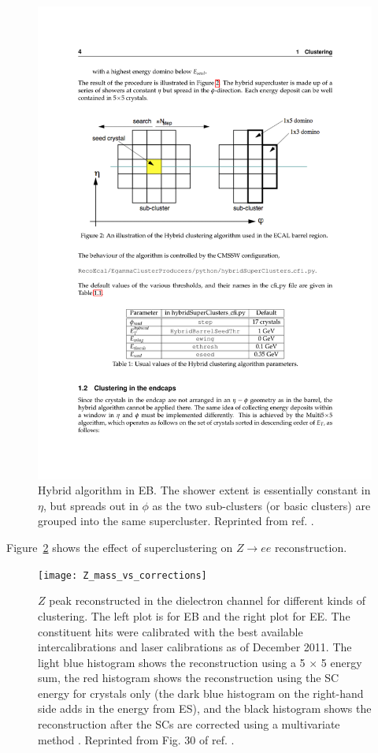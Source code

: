 \documentclass[dissertation.tex]{subfiles}
\begin{document}
\begin{figure}
	\centering
	\includegraphics[scale=0.5]{hybrid}
	\caption{Hybrid algorithm in EB.  The shower extent is essentially constant in $\eta$, but spreads out in $\phi$ as the two sub-clusters (or basic clusters) are grouped into the same supercluster.  Reprinted from ref. \cite{ECAL_SC_note}.}
	\label{fig:hybrid}
\end{figure}

Figure~\ref{fig:Z_mass_vs_corrections} shows the effect of superclustering on $Z\rightarrow ee$ reconstruction.

\begin{figure}
	\centering
	\texttt{[image: Z\_mass\_vs\_corrections]}
	\caption{$Z$ peak reconstructed in the dielectron channel for different kinds of clustering.  The left plot is for EB and the right plot for EE.  The constituent hits were calibrated with the best available intercalibrations and laser calibrations as of December 2011.  The light blue histogram shows the reconstruction using a 5 $\times$ 5 energy sum, the red histogram shows the reconstruction using the SC energy for crystals only (the dark blue histogram on the right-hand side adds in the energy from ES), and the black histogram shows the reconstruction after the SCs are corrected using a multivariate method \cite{Higgs_AN}.  Reprinted from Fig. 30 of ref. \cite{Higgs_AN}.}
	\label{fig:Z_mass_vs_corrections}
\end{figure}
\end{document}
